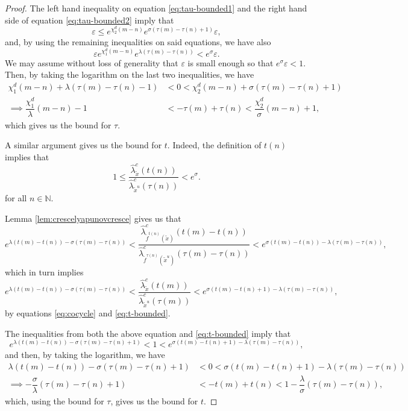 \documentclass[10pt,a4paper]{amsart}
\newcommand{\eps}{\varepsilon}
\newcommand{\tix}{\tilde{x}}
\begin{document}
\begin{proof}
    The left hand inequality on equation \eqref{eq:tau-bounded1} and the right hand side of equation \eqref{eq:tau-bounded2} imply that
    $$\varepsilon \leq e^{\chi_2^d(m-n)} e^{\sigma(\tau(m) - \tau(n) + 1)} \varepsilon,$$
    and, by using the remaining inequalities on said equations, we have also
    $$\varepsilon e^{\chi_1^d(m-n)} e^{\lambda(\tau(m) - \tau(n))} < e^\sigma \varepsilon.$$
    We may assume without loss of generality that $\eps$ is small enough so that $e^{\sigma}\eps<1$. Then, by taking the logarithm on the last two inequalities, we have
    \begin{align*}
        \chi_1^d(m-n) + \lambda(\tau(m) - \tau(n) - 1) &< 0 <  \chi_2^d(m-n) + \sigma(\tau(m) - \tau(n) + 1)\\
        \implies \dfrac{\chi_1^d}{\lambda} (m-n) - 1 &< - \tau(m) + \tau(n) < \dfrac{\chi_2^d}{\sigma} (m-n) + 1,
    \end{align*}
    which gives us the bound for $\tau$.

    A similar argument gives us the bound for $t$. Indeed, the definition of $t(n)$ implies that
    \begin{equation}
        \label{eq:t-bounded}
        1 \leq \dfrac{\hat{\lambda}^c_{\tix}(t(n))}{\hat{\lambda}^c_{\tix^u}(\tau(n))} < e^\sigma.
    \end{equation}
    for all $n \in \mathbb{N}$.
    
    Lemma \ref{lem:crescelyapunovcresce} gives us that
    $$e^{\lambda (t(m) - t(n)) - \sigma (\tau(m) - \tau(n))} < \dfrac{\hat{\lambda}^c_{\tilde{f}^{t(n)}(\tix)}(t(m) - t(n))}{\hat{\lambda}^c_{\tilde{f}^{\tau(n)}(\tix^u)}(\tau(m) - \tau(n))} < e^{\sigma (t(m) - t(n)) - \lambda (\tau(m) - \tau(n))},$$
    which in turn implies
    $$e^{\lambda (t(m) - t(n)) - \sigma (\tau(m) - \tau(n))} < \dfrac{\hat{\lambda}^c_{\tix}(t(m))}{\hat{\lambda}^c_{\tix^u}(\tau(m))} < e^{\sigma (t(m) - t(n) + 1) - \lambda (\tau(m) - \tau(n))},$$
    by equations \eqref{eq:cocycle} and \eqref{eq:t-bounded}.

    The inequalities from both the above equation and \eqref{eq:t-bounded} imply that
    $$e^{\lambda (t(m) - t(n)) - \sigma (\tau(m) - \tau(n) + 1)} < 1 < e^{\sigma (t(m) - t(n) + 1) - \lambda (\tau(m) - \tau(n))},$$
    and then, by taking the logarithm, we have
    \begin{align*}
        \lambda (t(m) - t(n)) - \sigma (\tau(m) - \tau(n) + 1) &< 0 < \sigma (t(m) - t(n) + 1) - \lambda (\tau(m) - \tau(n))\\
        \implies - \dfrac{\sigma}{\lambda} (\tau(m) - \tau(n) + 1) &< - t(m) + t(n) <  1 - \dfrac{\lambda}{\sigma} (\tau(m) - \tau(n)),
    \end{align*}
    which, using the bound for $\tau$, gives us the bound for $t$.
\end{proof}
\end{document}
